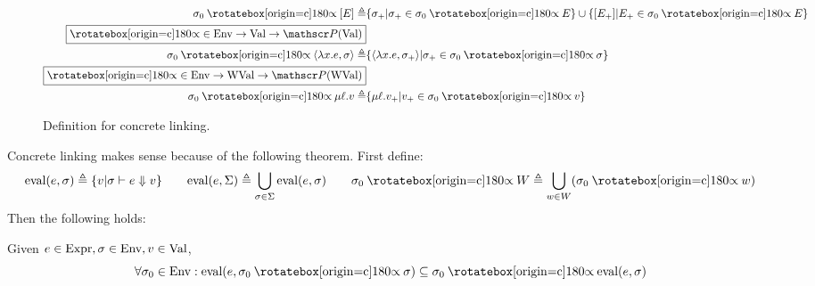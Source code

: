 \begin{figure}
\begin{align*}
    \ctx_0\semlink[E]\triangleq                            & \{\ctx_+|\ctx_+\in\ctx_0\semlink\event\}\cup\{[\event_+]|\event_+\in\ctx_0\semlink\event\}                                             \\
    \fbox{$\semlink\in\Ctx\rightarrow\Value\rightarrow\pset(\Value)$}                                                                                                                               \\
    \ctx_0\semlink\langle\lambda x.e,\ctx\rangle\triangleq & \{\langle\lambda x.e,\ctx_+\rangle|\ctx_+\in\ctx_0\semlink\ctx\}                                                                       \\
    \fbox{$\semlink\in\Ctx\rightarrow\Walue\rightarrow\pset(\Walue)$}                                                                                                                               \\
    \ctx_0\semlink\mu\ell.v\triangleq                      & \{\mu\ell.v_+|v_+\in\ctx_0\semlink v\}
  \end{align*}
  \caption{Definition for concrete linking.}
  \label{fig:conclink}
\end{figure}

Concrete linking makes sense because of the following theorem.
First define:
\[\eval(e,\ctx)\triangleq\{v|\ctx\vdash e\Downarrow v\}\qquad\eval(e,\Sigma)\triangleq\bigcup_{\ctx\in\Sigma}\eval(e,\ctx)\qquad\ctx_0\semlink W\triangleq\bigcup_{w\in W}(\ctx_0\semlink w)\]
Then the following holds:
\begin{theorem}\normalfont
  Given $e\in\text{Expr},\sigma\in\text{Env},v\in\text{Val}$,
  \[\forall\ctx_0\in\Ctx:\eval(e,\ctx_0\semlink\ctx)\subseteq\ctx_0\semlink\eval(e,\ctx)\]
\end{theorem}
